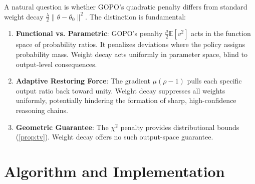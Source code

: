 \documentclass[11pt]{article}
\theoremstyle{definition}
\theoremstyle{remark}
\newcommand{\E}{\mathbb{E}}
\begin{document}
A natural question is whether GOPO's quadratic penalty differs from standard weight decay $\frac{\lambda}{2}\|\theta - \theta_0\|^2$. The distinction is fundamental:

\begin{enumerate}[leftmargin=2em]
    \item \textbf{Functional vs. Parametric}: GOPO's penalty $\frac{\mu}{2}\E[v^2]$ acts in the function space of probability ratios. It penalizes deviations where the policy assigns probability mass. Weight decay acts uniformly in parameter space, blind to output-level consequences.
    \item \textbf{Adaptive Restoring Force}: The gradient $\mu(\rho - 1)$ pulls each specific output ratio back toward unity. Weight decay suppresses all weights uniformly, potentially hindering the formation of sharp, high-confidence reasoning chains.
    \item \textbf{Geometric Guarantee}: The $\chi^2$ penalty provides distributional bounds (\cref{prop:tv}). Weight decay offers no such output-space guarantee.
\end{enumerate}

\section{Algorithm and Implementation}
\label{sec:algorithm}
\end{document}
